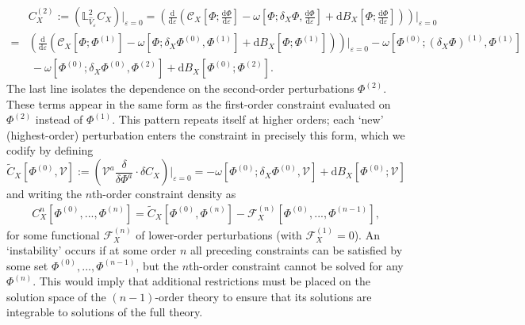 \documentclass[]{jkpaper}
\theoremstyle{plain}
\theoremstyle{definition}
\newcommand{\fins}{\cdot}
\newcommand{\sd}{\mathrm {d}}
\def\extd{\mathrm {d}}
\newcommand{\fL}{\mathbb{L}}
\begin{document}
\begin{equation}\begin{split}\label{eq: second order constraint, general}
     &C_X^{(2)}:=(\fL^2_{\hat{V}_\varepsilon}C_{X})|_{\varepsilon=0} 
      =\left(\frac{\extd}{\extd\varepsilon}\left(\mathcal{C}_X\left[\Phi;\frac{\extd\Phi}{\extd\varepsilon}\right]-\omega\left[\Phi;\delta_X\Phi,\frac{\extd\Phi}{\extd \varepsilon}\right]
      +\sd B_X\left[\Phi;\frac{\extd\Phi}{\extd\varepsilon}\right]\right)\right)\bigg|_{\varepsilon=0}\\
      =&
      \left(\frac{\extd}{\extd\varepsilon}\left(\mathcal{C}_X\left[\Phi;\Phi^{(1)}\right]
      - \omega\left[\Phi;\delta_X\Phi^{(0)},\Phi^{(1)}\right]
      +\sd B_X\left[\Phi;\Phi^{(1)}\right]
      \right)\right)\bigg|_{\varepsilon=0}
      -\omega\left[\Phi^{(0)};(\delta_X\Phi)^{(1)},\Phi^{(1)}\right]\\
      &~ -\omega\left[\Phi^{(0)};\delta_X\Phi^{(0)},\Phi^{(2)}\right]
      +\sd B_X\left[\Phi^{(0)};\Phi^{(2)}\right].
\end{split}\end{equation}
The last line isolates the dependence on the second-order perturbations $\Phi^{(2)}$.  These terms appear in the same form as the first-order constraint evaluated on $\Phi^{(2)}$ instead of $\Phi^{(1)}$.  This pattern repeats itself at higher orders; each `new' (highest-order) perturbation enters the constraint in precisely this form, which we codify by defining 
\begin{equation}\label{eq: universal piece}
    \tilde{C}_X[\Phi^{(0)},\mathcal{V}]:=\left(\mathcal{V}^a\frac{\delta}{\delta \Phi^a} \fins \delta C_X\right)\big|_{\varepsilon=0}
    =-\omega\left[\Phi^{(0)};\delta_X\Phi^{(0)},\mathcal{V}\right]
      +\sd B_X\left[\Phi^{(0)};\mathcal{V}\right]
\end{equation}
    and writing the $n$th-order constraint density as
\begin{equation}\begin{split}\label{eq: nth order constraint, general}
   C^{n}_X[\Phi^{(0)},...,\Phi^{(n)}]= \tilde{C}_X[\Phi^{(0)},\Phi^{(n)}] -\mathcal{F}^{(n)}_X[\Phi^{(0)},...,\Phi^{(n-1)}],
\end{split}\end{equation}
for some functional $\mathcal{F}^{(n)}_{X}$ of lower-order perturbations (with $\mathcal{F}_X^{(1)}=0$).  An `instability' occurs if at some order $n$ all preceding constraints can be satisfied by some set $\Phi^{(0)},...,\Phi^{(n-1)}$, but the $n$th-order constraint cannot be solved for any $\Phi^{(n)}$.  This would imply that additional restrictions must be placed on the solution space of the $(n-1)$-order theory to ensure that its solutions are integrable to solutions of the full theory.  
\end{document}
